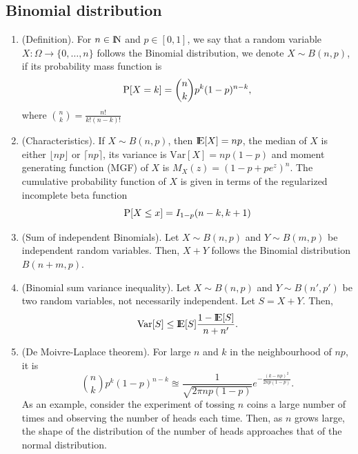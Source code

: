 \documentclass[a4paper,10pt]{scrbook}
\begin{document}
\subsection{Binomial distribution}\label{sec:binomial_distribution}
\begin{enumerate}
 \item (Definition). For \(n\in\N\) and \(p\in[0,1]\), we say that a random variable 
       \(X:\Omega\to\{0,\ldots, n\}\) follows the Binomial distribution, we denote 
       \(X \sim B(n,p)\), if its probability mass function is
       \[
        \mathrm{P}[X = k] = {n \choose k} p^k (1-p)^{n-k},
       \]
       where \({n \choose k} = \frac{n!}{k!(n-k)!}\)
 \item (Characteristics). If \(X \sim B(n,p)\), then \(\E[X]=np\), the median of \(X\) 
       is either \(\lfloor np \rfloor\) or \(\lceil np \rceil\), its variance is 
       \(\mathrm{Var}[X] = np(1-p)\) and moment generating function (MGF) of \(X\) is 
       \(M_X(z) = (1-p+pe^z)^n\). The cumulative probability function of \(X\) is given 
       in terms of the regularized incomplete beta function
       \[
        \mathrm{P}[X \leq x] = I_{1-p}(n-k, k+1)
       \]
 \item (Sum of independent Binomials). Let \(X\sim B(n,p)\) and \(Y\sim B(m,p)\) be 
       independent random variables. Then, \(X+Y\) follows the Binomial distribution
       \(B(n+m, p)\).
       
 \item (Binomial sum variance inequality). Let \(X\sim B(n,p)\) and \(Y\sim B(n',p')\) 
       be two random variables, not necessarily independent. Let \(S=X+Y\). Then,
       \[
        \mathrm{Var}[S] \leq \E[S]\frac{1-\E[S]}{n+n'}.
       \]
       
 \item (De Moivre-Laplace theorem). For large \(n\) and \(k\) in the neighbourhood of \(np\),
       it is 
       \[
        {n \choose k} p^k (1-p)^{n-k} \approxeq \frac{1}{\sqrt{2\pi n p (1-p)}}e^{-\frac{(k-np)^2}{2np(1-p)}}.
       \]
       As an example, consider the experiment of tossing \(n\) coins a large number of times 
       and observing the number of heads each time. Then, as \(n\) grows large, the shape of 
       the distribution of the number of heads approaches that of the normal distribution.
\end{enumerate}
\end{document}
